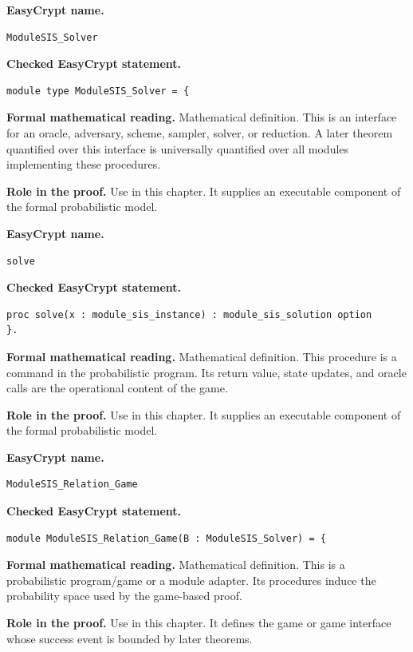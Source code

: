 \begin{formaldefinition}
\noindent\textbf{EasyCrypt name.}
\begin{lstlisting}[language=EasyCrypt,basicstyle=\ttfamily\scriptsize]
ModuleSIS_Solver
\end{lstlisting}
\noindent\textbf{Checked EasyCrypt statement.}
\begin{lstlisting}[language=EasyCrypt,basicstyle=\ttfamily\scriptsize]
module type ModuleSIS_Solver = {
\end{lstlisting}
\noindent\textbf{Formal mathematical reading.}
Mathematical definition. This is an interface for an oracle, adversary, scheme, sampler, solver, or reduction.  A later theorem quantified over this interface is universally quantified over all modules implementing these procedures.

\noindent\textbf{Role in the proof.}
Use in this chapter. It supplies an executable component of the formal probabilistic model.

\end{formaldefinition}

\begin{formaldefinition}
\noindent\textbf{EasyCrypt name.}
\begin{lstlisting}[language=EasyCrypt,basicstyle=\ttfamily\scriptsize]
solve
\end{lstlisting}
\noindent\textbf{Checked EasyCrypt statement.}
\begin{lstlisting}[language=EasyCrypt,basicstyle=\ttfamily\scriptsize]
proc solve(x : module_sis_instance) : module_sis_solution option
}.
\end{lstlisting}
\noindent\textbf{Formal mathematical reading.}
Mathematical definition. This procedure is a command in the probabilistic program.  Its return value, state updates, and oracle calls are the operational content of the game.

\noindent\textbf{Role in the proof.}
Use in this chapter. It supplies an executable component of the formal probabilistic model.

\end{formaldefinition}

\begin{formaldefinition}
\noindent\textbf{EasyCrypt name.}
\begin{lstlisting}[language=EasyCrypt,basicstyle=\ttfamily\scriptsize]
ModuleSIS_Relation_Game
\end{lstlisting}
\noindent\textbf{Checked EasyCrypt statement.}
\begin{lstlisting}[language=EasyCrypt,basicstyle=\ttfamily\scriptsize]
module ModuleSIS_Relation_Game(B : ModuleSIS_Solver) = {
\end{lstlisting}
\noindent\textbf{Formal mathematical reading.}
Mathematical definition. This is a probabilistic program/game or a module adapter.  Its procedures induce the probability space used by the game-based proof.

\noindent\textbf{Role in the proof.}
Use in this chapter. It defines the game or game interface whose success event is bounded by later theorems.

\end{formaldefinition}

